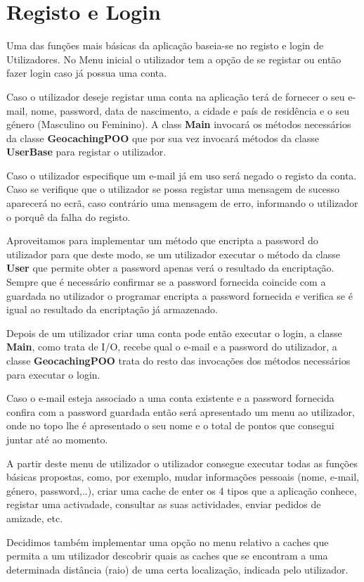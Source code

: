 \documentclass{article}
\begin{document}
\section{Registo e Login}
\par Uma das funções mais básicas da aplicação baseia-se no registo e login de Utilizadores. No Menu inicial o utilizador tem
a opção de se registar ou então fazer login caso já possua uma conta.
\par Caso o utilizador deseje registar uma conta na aplicação terá de fornecer o seu e-mail, nome, password,
data de nascimento, a cidade e país de residência e o seu género (Masculino ou Feminino). A class \textbf{Main} invocará
os métodos necessários da classe \textbf{GeocachingPOO} que por sua vez invocará métodos da classe
\textbf{UserBase} para registar o utilizador.
\par Caso o utilizador especifique um e-mail já em uso será negado o registo da conta. Caso se verifique que o utilizador se
possa registar uma mensagem de sucesso aparecerá no ecrã, caso contrário uma mensagem de erro, informando o utilizador
o porquê da falha do registo.
\par Aproveitamos para implementar um método que encripta a password do utilizador para que deste modo, se um utilizador
executar o método da classe \textbf{User} que permite obter a password apenas verá o resultado da encriptação.
Sempre que é necessário confirmar se a password fornecida coincide com a guardada no utilizador o programar encripta a password fornecida e verifica se é igual ao resultado da encriptação já armazenado.
\\
\par Depois de um utilizador criar uma conta pode então executar o login, a classe \textbf{Main}, como trata de I/O, recebe qual
o e-mail e a password do utilizador, a classe \textbf{GeocachingPOO} trata do resto das invocações dos métodos necessários
para executar o login.
\par Caso o e-mail esteja associado a uma conta existente e a password fornecida confira com a password guardada então
será apresentado um menu ao utilizador, onde no topo lhe é apresentado o seu nome e o total de pontos que consegui juntar
até ao momento.
\par A partir deste menu de utilizador o utilizador consegue executar todas as funções básicas propostas, como, por exemplo,
mudar informações pessoais (nome, e-mail, género, password,..), criar uma cache de enter os 4 tipos que a aplicação
conhece, registar uma activadade, consultar as suas actividades, enviar pedidos de amizade, etc.
\par Decidimos também implementar uma opção no menu relativo a caches que permita a um utilizador descobrir quais as
caches que se encontram a uma determinada distância (raio) de uma certa localização, indicada pelo utilizador.
\end{document}
